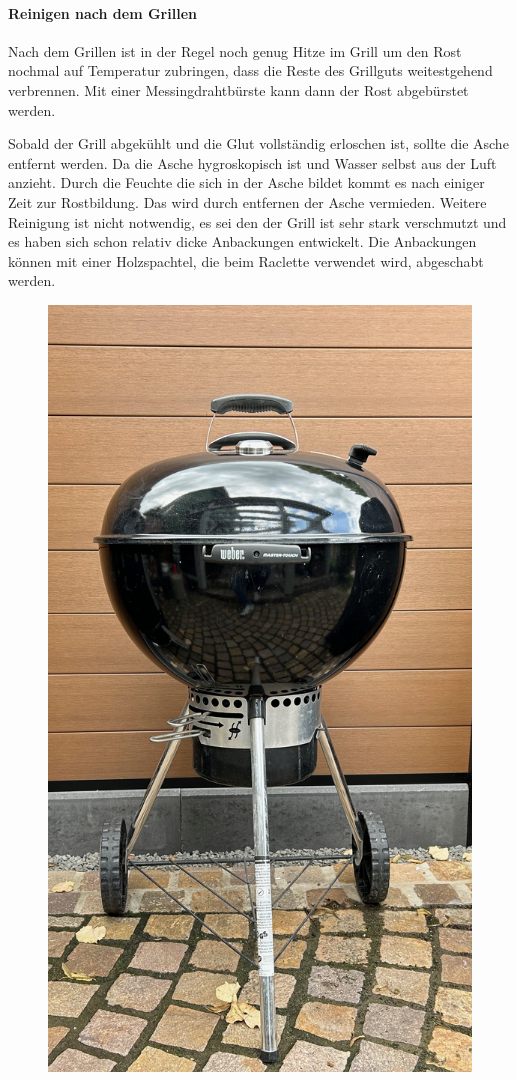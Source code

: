 	\paragraph{Reinigen nach dem Grillen}

	Nach dem Grillen ist in der Regel noch genug Hitze im Grill um den Rost 
	nochmal auf Temperatur zubringen, dass die Reste 
	des Grillguts 
	weitestgehend verbrennen. 
	Mit einer Messingdrahtbürste kann dann der Rost abgebürstet werden.
	
	Sobald der Grill abgekühlt und die Glut vollständig erloschen ist, sollte die 
	Asche entfernt werden. Da die Asche 
	hygroskopisch ist und Wasser 
	selbst aus 
	der Luft anzieht. Durch die Feuchte die sich in der Asche bildet kommt es nach 
	einiger Zeit zur Rostbildung. Das wird durch 
	entfernen der Asche 
	vermieden.
	Weitere Reinigung ist nicht notwendig, es sei den der Grill ist sehr stark 
	verschmutzt und es haben sich schon relativ dicke 
	Anbackungen 
	entwickelt.
	Die Anbackungen können mit einer Holzspachtel, die beim Raclette verwendet 
	wird, abgeschabt werden.
	
	
		\begin{figure}[htbp]
		\centering
		\begin{minipage}{1\textwidth}
			\centering
			\includegraphics[width=.6\linewidth]{pics/Kugelgrill}
			\label{fig:Kugelgrill}
		\end{minipage}%
	\end{figure}
	
